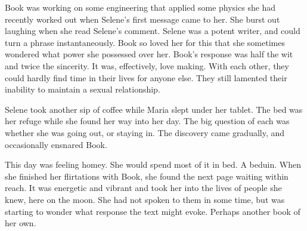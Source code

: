 Book was working on some engineering that applied some physics she had
recently worked out when Selene's first message came to her.  She
burst out laughing when she read Selene's comment.  Selene was a
potent writer, and could turn a phrase instantaneously.  Book so loved
her for this that she sometimes wondered what power she possessed over
her.  Book's response was half the wit and twice the sincerity.  It
was, effectively, love making.  With each other, they could hardly
find time in their lives for anyone else.  They still lamented their
inability to maintain a sexual relationship.

Selene took another sip of coffee while Maria slept under her tablet.
The bed was her refuge while she found her way into her day.  The big
question of each was whether she was going out, or staying in.  The
discovery came gradually, and occasionally ensnared Book.

This day was feeling homey.  She would spend most of it in bed.  A
beduin.  When she finished her flirtations with Book, she found the
next page waiting within reach.  It was energetic and vibrant and took
her into the lives of people she knew, here on the moon.  She had not
spoken to them in some time, but was starting to wonder what response
the text might evoke.  Perhaps another book of her own.

\bye
